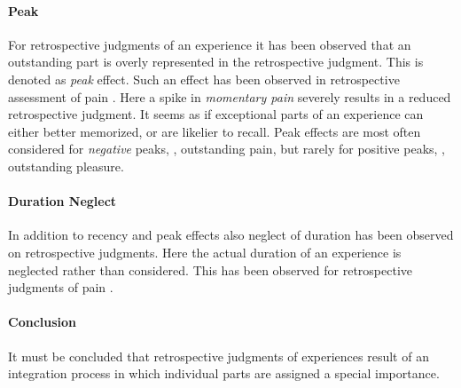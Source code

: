\paragraph*{Peak}
For retrospective judgments of an experience it has been observed that an outstanding part is overly represented in the retrospective judgment.
This is denoted as \emph{peak} effect.
Such an effect has been observed in retrospective assessment of pain \citep[\cf,][]{kahneman_when_1993, redelmeier_patients_1996}.
Here a spike in \emph{momentary pain} severely results in a reduced retrospective judgment.
It seems as if exceptional parts of an experience can either better memorized, or are likelier to recall.
Peak effects are most often considered for \emph{negative} peaks, \eg, outstanding pain, but rarely for positive peaks, \eg, outstanding pleasure.

\paragraph*{Duration Neglect}
In addition to recency and peak effects also neglect of duration has been observed on retrospective judgments.
Here the actual duration of an experience is neglected rather than considered.
This has been observed for retrospective judgments of pain \citep[\cf,][]{fredrickson_duration_1993, ariely_combining_1998}.

\paragraph*{Conclusion}
It must be concluded that retrospective judgments of experiences result of an integration process in which individual parts are assigned a special importance.
